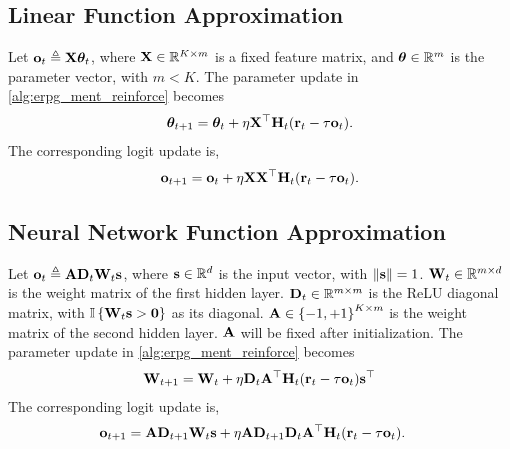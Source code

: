 \subsection{Linear Function Approximation}

Let ${\mathbf{o}}_t \triangleq {\mathbf{X}} {\boldsymbol{\theta}}_t$, where ${\mathbf{X}} \in {\mathbb{R}}^{K \times m}$ is a fixed feature matrix, and ${\boldsymbol{\theta}} \in {\mathbb{R}}^m$ is the parameter vector, with $m < K$. The parameter update in \cref{alg:erpg_ment_reinforce} becomes
\begin{equation*}
\begin{split}
    {\boldsymbol{\theta}}_{t+1} = {\boldsymbol{\theta}}_{t} + \eta {\mathbf{X}}^\top {\mathbf{H}}_t ({\mathbf{r}}_t - \tau {\mathbf{o}}_t).
\end{split}
\end{equation*}
The corresponding logit update is,
\begin{equation*}
\begin{split}
    {\mathbf{o}}_{t+1} = {\mathbf{o}}_{t} + \eta {\mathbf{X}} {\mathbf{X}}^\top {\mathbf{H}}_t ({\mathbf{r}}_t - \tau {\mathbf{o}}_t).
\end{split}
\end{equation*}

\subsection{Neural Network Function Approximation}

Let ${\mathbf{o}}_t \triangleq {\mathbf{A}} {\mathbf{D}}_t {\mathbf{W}}_t {\mathbf{s}}$, where ${\mathbf{s}} \in {\mathbb{R}}^d$ is the input vector, with $\| {\mathbf{s}} \| = 1$. ${\mathbf{W}}_t \in {\mathbb{R}}^{m \times d}$ is the weight matrix of the first hidden layer. ${\mathbf{D}}_t \in {\mathbb{R}}^{m \times m}$ is the ReLU diagonal matrix, with ${\mathbb{I}}\left\{ {\mathbf{W}}_t {\mathbf{s}} > {\mathbf{0}} \right\}$ as its diagonal. ${\mathbf{A}} \in \left\{ -1, +1 \right\}^{K \times m}$ is the weight matrix of the second hidden layer. ${\mathbf{A}}$ will be fixed after initialization. The parameter update in \cref{alg:erpg_ment_reinforce} becomes
\begin{equation*}
\begin{split}
    {\mathbf{W}}_{t+1} = {\mathbf{W}}_{t} + \eta {\mathbf{D}}_t {\mathbf{A}}^\top {\mathbf{H}}_t ( {\mathbf{r}}_t - \tau {\mathbf{o}}_t) {\mathbf{s}}^\top
\end{split}
\end{equation*}
The corresponding logit update is,
\begin{equation*}
\begin{split}
    {\mathbf{o}}_{t+1} &= {\mathbf{A}} {\mathbf{D}}_{t+1} {\mathbf{W}}_{t} {\mathbf{s}} + \eta {\mathbf{A}} {\mathbf{D}}_{t+1} {\mathbf{D}}_{t} {\mathbf{A}}^\top {\mathbf{H}}_t ({\mathbf{r}}_t - \tau {\mathbf{o}}_t).
\end{split}
\end{equation*}
